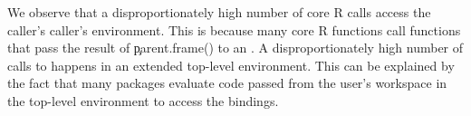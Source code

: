 \documentclass[conference]{IEEEtran}
\begin{document}
\begin{table}[htbp]  \label{tab:environments}
\caption{Environments in terms of eval calls.}
\end{table}

We observe that a disproportionately high number of core R \eval calls access the
caller's caller's environment. This is because many core R functions call
functions that pass the result of \c{parent.frame()} to an \eval.
A disproportionately high number of calls to \eval happens in an extended
top-level environment. This can be explained by the fact that many packages
evaluate code passed from the user's workspace in the top-level environment to
access the bindings.


\end{document}
